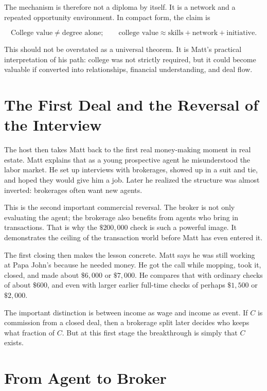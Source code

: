 The mechanism is therefore not a diploma by itself. It is a network and a repeated opportunity environment. In compact form, the claim is

\begin{equation}
\text{College value} \neq \text{degree alone};
\qquad
\text{college value} \approx \text{skills}+\text{network}+\text{initiative}.
\end{equation}

This should not be overstated as a universal theorem. It is Matt's practical interpretation of his path: college was not strictly required, but it could become valuable if converted into relationships, financial understanding, and deal flow.

\section{The First Deal and the Reversal of the Interview}

The host then takes Matt back to the first real money-making moment in real estate. Matt explains that as a young prospective agent he misunderstood the labor market. He set up interviews with brokerages, showed up in a suit and tie, and hoped they would give him a job. Later he realized the structure was almost inverted: brokerages often want new agents.

This is the second important commercial reversal. The broker is not only evaluating the agent; the brokerage also benefits from agents who bring in transactions. That is why the \(\$200{,}000\) check is such a powerful image. It demonstrates the ceiling of the transaction world before Matt has even entered it.

The first closing then makes the lesson concrete. Matt says he was still working at Papa John's because he needed money. He got the call while mopping, took it, closed, and made about \(\$6{,}000\) or \(\$7{,}000\). He compares that with ordinary checks of about \(\$600\), and even with larger earlier full-time checks of perhaps \(\$1{,}500\) or \(\$2{,}000\).

The important distinction is between income as wage and income as event. If \(C\) is commission from a closed deal, then a brokerage split later decides who keeps what fraction of \(C\). But at this first stage the breakthrough is simply that \(C\) exists.

\section{From Agent to Broker}

